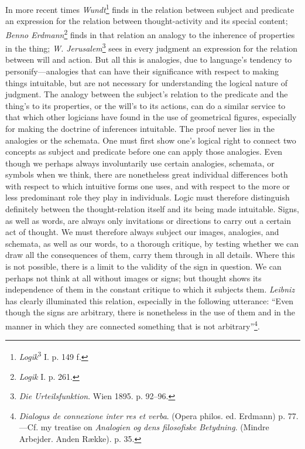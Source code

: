 \documentclass[12pt,a4paper]{book}
\newcommand{\opage}[1]{\marginnote{\footnotesize\textit{[#1]}}}
\begin{document}
In more recent times \emph{Wundt}\footnote{\emph{Logik}\textsuperscript{3}
I. p. 149 f.} finds in the relation between subject and predicate an
expression for the relation between thought-activity and its special
content; \emph{Benno Erdmann}\footnote{\emph{Logik} I. p. 261.} finds in
that relation an analogy to the inherence of properties in the thing;
\emph{W. Jerusalem}\footnote{\emph{Die Urteilsfunktion}. Wien 1895. p.
92--96.} sees in every judgment an expression for the relation between will
and action. But all this is analogies, due to language's tendency to
personify---analogies that can have their significance with respect to
making things intuitable, but are not necessary for understanding the
logical nature of judgment. The analogy between the subject's relation to
the predicate and the thing's to its properties, or the will's to its
actions, can do a similar service to that which other logicians have found
in the use of geometrical figures, especially for making the doctrine of
inferences intuitable. The proof never lies in the analogies or the
schemata. One must first show one's logical right to connect two concepts
as subject and predicate before one can apply those analogies. Even though
we perhaps always involuntarily use certain analogies, schemata, or symbols
when we think, there are nonetheless great individual differences both with
respect to which intuitive forms one uses, and with respect to the more or
less predominant role they play in individuals. Logic must therefore
distinguish definitely \opage{98}between the thought-relation itself and its being
made intuitable. Signs, as well as words, are always only invitations or
directions to carry out a certain act of thought. We must therefore always
subject our images, analogies, and schemata, as well as our words, to a
thorough critique, by testing whether we can draw all the consequences of
them, carry them through in all details. Where this is not possible, there
is a limit to the validity of the sign in question. We can perhaps not
think at all without images or signs; but thought shows its independence of
them in the constant critique to which it subjects them. \emph{Leibniz} has
clearly illuminated this relation, especially in the following utterance:
``Even though the signs are arbitrary, there is nonetheless in the use of
them and in the manner in which they are connected something that is not
arbitrary''\footnote{\emph{Dialogus de connexione inter res et verba}.
(Opera philos. ed. Erdmann) p. 77.---Cf. my treatise on \emph{Analogien og
dens filosofiske Betydning}. (Mindre Arbejder. Anden Række). p. 35.}.
\end{document}
